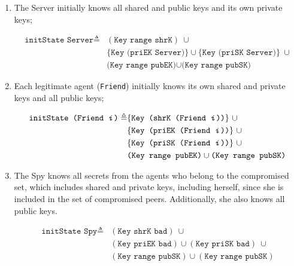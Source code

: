 \begin{enumerate}
  \item The Server initially knows all shared and public keys and its own private keys;

  \begin{equation*}
    \begin{split}
      \texttt{initState Server} \triangleq
      & (\texttt{Key range shrK}) \  \cup \\
      & \{\texttt{Key (priEK Server)}\} \cup \{\texttt{Key (priSK Server)}\}\  \cup \\
      & \texttt{(Key range pubEK)} \cup \texttt{(Key range pubSK)}
    \end{split}
  \end{equation*}


  \item Each legitimate agent (\texttt{Friend}) initially knows its own shared and private keys and all public keys;

  \begin{equation*}
    \begin{split}
      \texttt{initState (Friend \textit{i})} \triangleq
      & \{ \texttt{Key (shrK (Friend \textit{i}))} \} \ \cup \\
      & \{ \texttt{Key (priEK (Friend \textit{i}))} \} \ \cup \\
      & \{ \texttt{Key (priSK (Friend \textit{i}))} \} \ \cup \\
      & \texttt{(Key range pubEK)} \cup \texttt{(Key range pubSK)}
    \end{split}
  \end{equation*}


  \item The Spy knows all secrets from the agents who belong to the compromised set, which includes shared and private keys, including herself, since she is included in the set of compromised peers. Additionally, she also knows all public keys.

  \begin{equation*}
    \begin{split}
      \texttt{initState Spy} \triangleq
      & (\texttt{Key shrK bad}) \ \cup \\
      & (\texttt{Key priEK bad}) \cup (\texttt{Key priSK bad}) \ \cup \\
      & (\texttt{Key range pubSK}) \cup (\texttt{Key range pubSK})
    \end{split}
  \end{equation*}

\end{enumerate}

